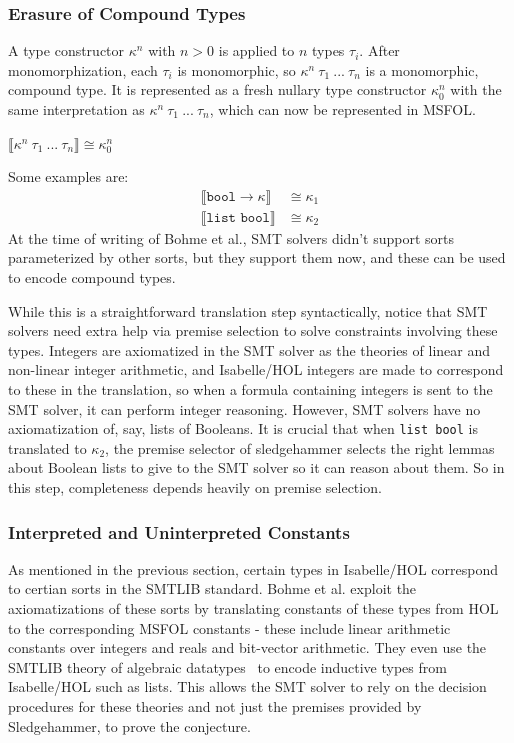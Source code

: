 \documentclass{article}
\begin{document}
	\subsubsection{Erasure of Compound Types}
		A type constructor $\kappa^n$ with 
		$n > 0$ is applied to $n$ types 
		$\tau_i$. After monomorphization, 
		each $\tau_i$ is monomorphic, so 
		$\kappa^n\ \tau_1\ ...\ \tau_n$ 
		is a monomorphic, compound type. It
		is represented as a fresh nullary 
		type constructor $\kappa_0^n$ with 
		the same interpretation as 
		$\kappa^n\ \tau_1\ ...\ \tau_n$, 
		which can now be represented in 
		MSFOL.
		\begin{center}
			$\llbracket \kappa^n\ 
			\tau_1\ ...\ \tau_n \rrbracket
			\cong \kappa_0^n$
		\end{center}
		Some examples are:
		\begin{align*}
			\llbracket \texttt{bool} \to
			\kappa \rrbracket &\cong \kappa_1\\
			\llbracket \texttt{list\ bool}
			\rrbracket &\cong \kappa_2
		\end{align*}
		At the time of writing of Bohme et al.,
		SMT solvers didn't support sorts 
		parameterized by other sorts, but they 
		support them now, and these can be 
		used to encode compound types.
		
		While this is a straightforward
		translation step syntactically, 
		notice that SMT solvers need 
		extra help via premise selection 
		to solve constraints involving 
		these types. Integers are 
		axiomatized in the SMT solver as 
		the theories of linear and 
		non-linear integer arithmetic, and 
		Isabelle/HOL integers are made to 
		correspond to these in the translation, 
		so when a formula containing 
		integers is sent to the SMT solver, 
		it can perform integer reasoning. 
		However, SMT solvers have no 
		axiomatization of, say, lists 
		of Booleans. It is crucial that when 
		\texttt{list bool} is 
		translated to $\kappa_2$, the 
		premise selector of sledgehammer
		selects the right lemmas about 
		Boolean lists to give to the 
		SMT solver so it can reason 
		about them. So in this step, 
		completeness depends heavily on 
		premise selection.
		
	\subsubsection{Interpreted and Uninterpreted Constants}
		As mentioned in the previous section,
		certain types in Isabelle/HOL correspond
		to certian sorts in the SMTLIB standard.
		Bohme et al. exploit the axiomatizations 
		of these sorts by translating constants 
		of these types from HOL to the 
		corresponding MSFOL constants - these 
		include linear arithmetic constants over 
		integers and reals and bit-vector 
		arithmetic. They even use the SMTLIB 
		theory of algebraic 
		datatypes~\cite{BarST-PDPAR-06} to 
		encode inductive types from Isabelle/HOL
		such as lists. This allows the SMT solver
		to rely on the decision procedures for 
		these theories and not just the premises
		provided by Sledgehammer, to prove the 
		conjecture. 
		
\end{document}
